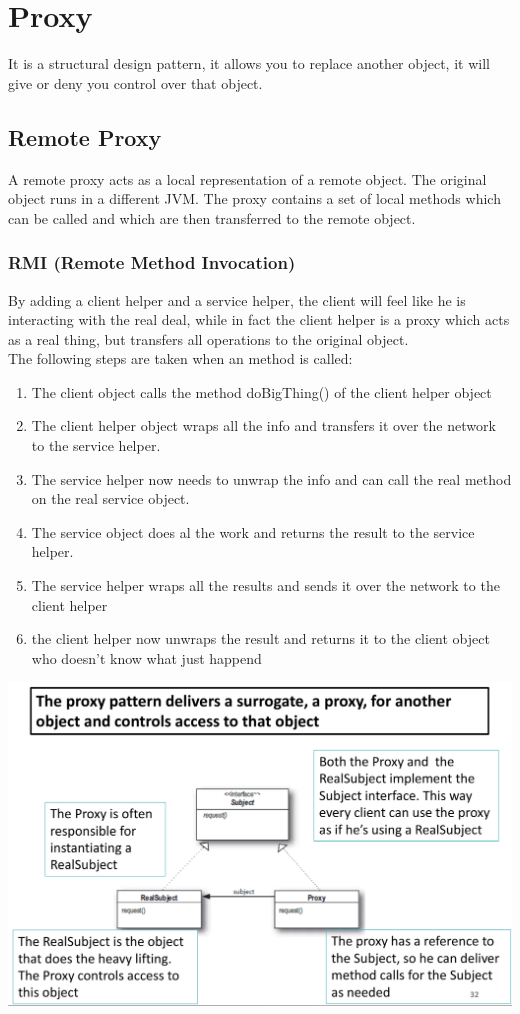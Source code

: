 \documentclass{report}
\begin{document}
	\chapter{Proxy} 
		It is a structural design pattern, it allows you to replace another object, it will give or deny you control over that object. 
		\section{Remote Proxy}
			A remote proxy acts as a local representation of a remote object. The original object runs in a different JVM. The proxy contains a set of local methods which can be called and which are then transferred to the remote object. 
			\subsection{RMI (Remote Method Invocation)}
				By adding a client helper and a service helper, the client will feel like he is interacting with the real deal, while in fact the client helper is a proxy which acts as a real thing, but transfers all operations to the original object. \\
				The following steps are taken when an method is called:
				\begin{enumerate}
					\item The client object calls the method doBigThing() of the client helper object
					\item The client helper object wraps all the info and transfers it over the network to the service helper.
					\item The service helper now needs to unwrap the info and can call the real method on the real service object.
					\item The service object does al the work and returns the result to the service helper.
					\item The service helper wraps all the results and sends it over the network to the client helper
					\item the client helper now unwraps the result and returns it to the client object who doesn't know what just happend
				\end{enumerate}
			\begin{center}
				\includegraphics[scale=0.4]{remote_proxy}
			\end{center}
\end{document}
